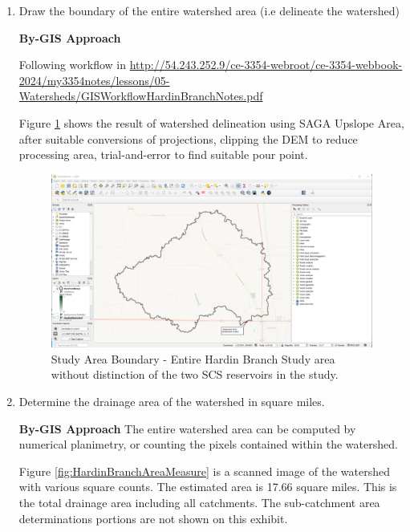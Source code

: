 \documentclass[12pt]{article}
\begin{document}
\begin{enumerate}
\clearpage

\item Draw the boundary of the entire watershed area (i.e delineate the watershed)

\textbf{By-GIS Approach}

Following workflow in \url{http://54.243.252.9/ce-3354-webroot/ce-3354-webbook-2024/my3354notes/lessons/05-Watersheds/GISWorkflowHardinBranchNotes.pdf}

Figure \ref{fig:HardinBranchGIS-WSbnd} shows the result of watershed delineation using SAGA Upslope Area, after suitable conversions of projections, clipping the DEM to reduce processing area, trial-and-error to find suitable pour point.

\begin{figure}[h!] %
   \centering
   \includegraphics[width=6in]{HardinBranchGIS-WSbnd.png} 
   \caption{Study Area Boundary - Entire Hardin Branch Study area without distinction of the two SCS reservoirs in the study.}
   \label{fig:HardinBranchGIS-WSbnd}
\end{figure}

\clearpage

\item Determine the drainage area of the watershed in square miles.

\textbf{By-GIS Approach}
The entire watershed area can be computed by numerical planimetry, or counting the pixels contained within the watershed. 

Figure \ref{fig:HardinBranchAreaMeasure} is a scanned image of the watershed with various square counts.  The estimated area is 17.66 square miles.   This is the total drainage area including all catchments.  The sub-catchment area determinations portions are not shown on this exhibit.  


\end{enumerate}
\end{document}
